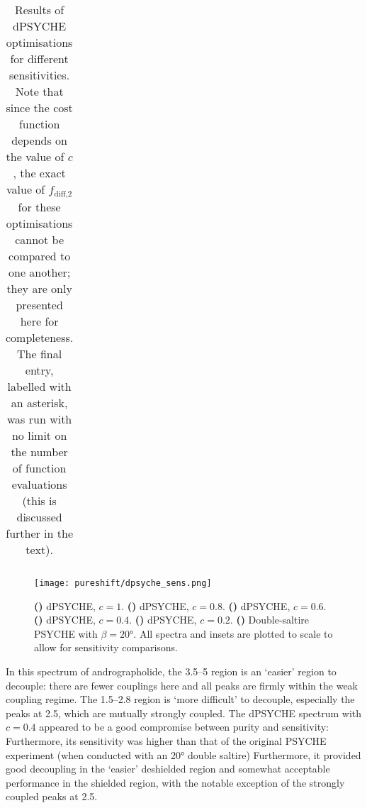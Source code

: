 \begin{table}[htb]
\begin{tabular}{cccc}
        \bottomrule
    \end{tabular}
    \caption[dPSYCHE optimisation results for different sensitivities]{
        Results of dPSYCHE optimisations for different sensitivities.
        Note that since the cost function depends on the value of $c$, the exact value of $f_\text{diff,2}$ for these optimisations cannot be compared to one another; they are only presented here for completeness.
        The final entry, labelled with an asterisk, was run with no limit on the number of function evaluations (this is discussed further in the text).
    }
    \label{tbl:dpsyche_sens}
\end{table}

\begin{figure}[htbp]
    \centering
    \texttt{[image: pureshift/dpsyche\_sens.png]}
    {\label{fig:dpsyche_sens_d1}}
    {\label{fig:dpsyche_sens_d0p8}}
    {\label{fig:dpsyche_sens_d0p6}}
    {\label{fig:dpsyche_sens_d0p4}}
    {\label{fig:dpsyche_sens_d0p2}}
    {\label{fig:dpsyche_sens_p}}
    \caption[dPSYCHE optimisations with different sensitivities]{
        \textbf{()} dPSYCHE, $c = 1$.
        \textbf{()} dPSYCHE, $c = 0.8$.
        \textbf{()} dPSYCHE, $c = 0.6$.
        \textbf{()} dPSYCHE, $c = 0.4$.
        \textbf{()} dPSYCHE, $c = 0.2$.
        \textbf{()} Double-saltire PSYCHE with $\beta = \ang{20}$.
        All spectra and insets are plotted to scale to allow for sensitivity comparisons.
    }
    \label{fig:dpsyche_sens}
\end{figure}

In this spectrum of andrographolide, the \qtyrange{3.5}{5}{\ppm} region is an `easier' region to decouple: there are fewer couplings here and all peaks are firmly within the weak coupling regime.
The \qtyrange{1.5}{2.8}{\ppm} region is `more difficult' to decouple, especially the peaks at \SI{2.5}{\ppm}, which are mutually strongly coupled.
The dPSYCHE spectrum with $c = 0.4$ appeared to be a good compromise between purity and sensitivity:
Furthermore, its sensitivity was higher than that of the original PSYCHE experiment (when conducted with an \ang{20} double saltire)
Furthermore, it provided good decoupling in the `easier' deshielded region and somewhat acceptable performance in the shielded region, with the notable exception of the strongly coupled peaks at \SI{2.5}{\ppm}.

